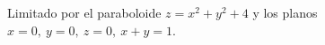\item Limitado por el paraboloide $z = x^2 + y^2 + 4$ y los planos $x = 0, \ y = 0, \ z = 0, \ x + y = 1$.
